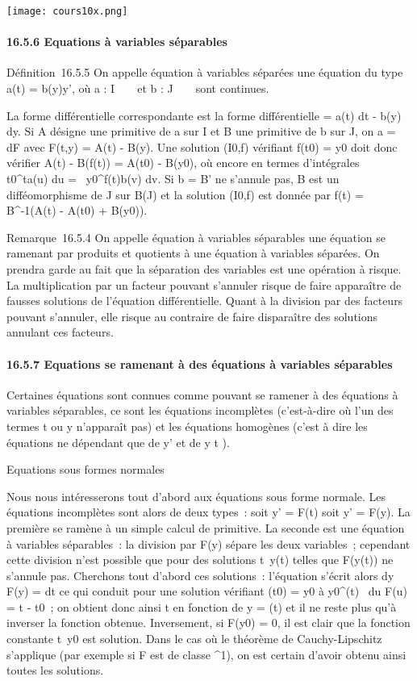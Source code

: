 \texttt{[image: cours10x.png]}

\paragraph{16.5.6 Equations à variables séparables}

Définition~16.5.5 On appelle équation à variables séparées une équation
du type a(t) = b(y)y', où a : I \rightarrow~ ~ et b : J \rightarrow~ ~ sont continues.

La forme différentielle correspondante est la forme différentielle \omega =
a(t) dt - b(y) dy. Si A désigne une primitive de a sur I et B une
primitive de b sur J, on a \omega = dF avec F(t,y) = A(t) - B(y). Une
solution (I0,f) vérifiant f(t0) = y0 doit
donc vérifier A(t) - B(f(t)) = A(t0) - B(y0), où
encore en termes d'intégrales \int ~
t0^ta(u) du =\int ~
y0^f(t)b(v) dv. Si b = B' ne s'annule pas, B
est un difféomorphisme de J sur B(J) et la solution (I0,f) est
donnée par f(t) = B^-1\left (A(t) -
A(t0) + B(y0)\right ).

Remarque~16.5.4 On appelle équation à variables séparables une équation
se ramenant par produits et quotients à une équation à variables
séparées. On prendra garde au fait que la séparation des variables est
une opération à risque. La multiplication par un facteur pouvant
s'annuler risque de faire apparaître de fausses solutions de l'équation
différentielle. Quant à la division par des facteurs pouvant s'annuler,
elle risque au contraire de faire disparaître des solutions annulant ces
facteurs.

\paragraph{16.5.7 Equations se ramenant à des équations à variables
séparables}

Certaines équations sont connues comme pouvant se ramener à des
équations à variables séparables, ce sont les équations incomplètes
(c'est-à-dire où l'un des termes t ou y n'apparaît pas) et les équations
homogènes (c'est à dire les équations ne dépendant que de y' et de  y
\over t ).

Equations sous formes normales

Nous nous intéresserons tout d'abord aux équations sous forme normale.
Les équations incomplètes sont alors de deux types~: soit y' = F(t) soit
y' = F(y). La première se ramène à un simple calcul de primitive. La
seconde est une équation à variables séparables~: la division par F(y)
sépare les deux variables~; cependant cette division n'est possible que
pour des solutions t\mapsto~y(t) telles que F(y(t))
ne s'annule pas. Cherchons tout d'abord ces solutions~: l'équation
s'écrit alors  dy \over F(y) = dt ce qui conduit pour
une solution vérifiant \phi(t0) = y0 à
\int  y0^\phi(t)~ du
\over F(u) = t - t0~; on obtient donc ainsi t
en fonction de y = \phi(t) et il ne reste plus qu'à inverser la fonction
obtenue. Inversement, si F(y0) = 0, il est clair que la
fonction constante t\mapsto~y0 est
solution. Dans le cas où le théorème de Cauchy-Lipschitz s'applique (par
exemple si F est de classe ^1), on est certain d'avoir
obtenu ainsi toutes les solutions.

